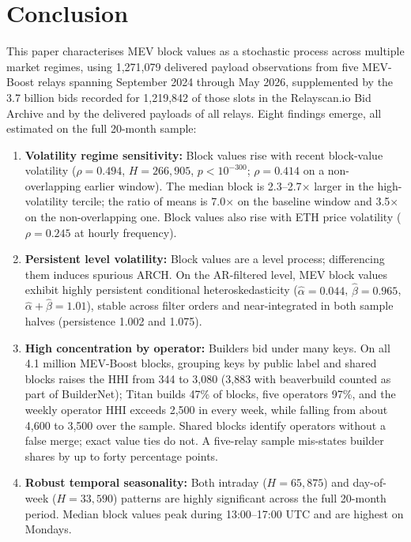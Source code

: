 \documentclass[11pt]{article}
\begin{document}
\section{Conclusion}
\label{sec:conclusion}

This paper characterises MEV block values as a stochastic process across
multiple market regimes, using 1,271,079 delivered payload observations from five
MEV-Boost relays spanning September 2024 through May 2026, supplemented by
the 3.7 billion bids recorded for 1,219,842 of those slots in the
Relayscan.io Bid Archive and by the delivered payloads of all relays. Eight findings emerge, all estimated on the full
20-month sample:

\begin{enumerate}
\item \textbf{Volatility regime sensitivity:} Block values rise with recent
block-value volatility ($\rho = 0.494$, $H = 266{,}905$, $p < 10^{-300}$;
$\rho = 0.414$ on a non-overlapping earlier window). The median block is
2.3--2.7$\times$ larger in the high-volatility tercile; the ratio of means is
7.0$\times$ on the baseline window and 3.5$\times$ on the non-overlapping
one. Block values also rise with ETH price volatility ($\rho = 0.245$ at
hourly frequency).

\item \textbf{Persistent level volatility:} Block values are a level process;
differencing them induces spurious ARCH. On the AR-filtered level, MEV block
values exhibit highly persistent conditional heteroskedasticity
($\hat\alpha = 0.044$, $\hat\beta = 0.965$, $\hat\alpha + \hat\beta = 1.01$),
stable across filter orders and near-integrated in both sample halves
(persistence 1.002 and 1.075).

\item \textbf{High concentration by operator:} Builders bid under many keys.
On all 4.1 million MEV-Boost blocks, grouping keys by public label and
shared blocks raises the HHI from 344 to 3,080 (3,883 with beaverbuild
counted as part of BuilderNet); Titan builds 47\% of blocks, five operators
97\%, and the weekly operator HHI exceeds 2,500 in every week, while falling
from about 4,600 to 3,500 over the sample. Shared blocks identify operators
without a false merge; exact value ties do not. A five-relay sample
mis-states builder shares by up to forty percentage points.

\item \textbf{Robust temporal seasonality:} Both intraday ($H = 65{,}875$) and
day-of-week ($H = 33{,}590$) patterns are highly significant across the full
20-month period. Median block values peak during 13:00--17:00 UTC and are
highest on Mondays.


\end{enumerate}
\end{document}

